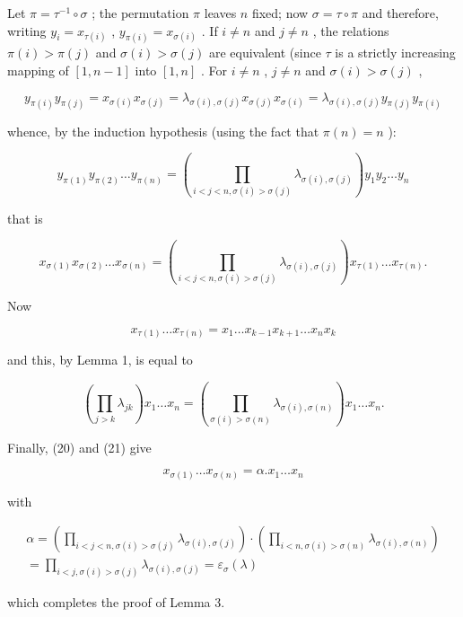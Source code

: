 Let \(\pi = \tau^{-1} \circ \sigma\) ; the permutation \(\pi\) leaves \(n\) fixed; now \(\sigma = \tau \circ \pi\) and therefore, writing \(y_i = x_{\tau(i)}\) , \(y_{\pi(i)} = x_{\sigma(i)}\) . If \(i \neq n\) and \(j \neq n\) , the relations \(\pi(i) > \pi(j)\) and \(\sigma(i) > \sigma(j)\) are equivalent (since \(\tau\) is a strictly increasing mapping of \([1, n - 1]\) into \([1, n]\) . For \(i \neq n\) , \(j \neq n\) and \(\sigma(i) > \sigma(j)\) ,

\[
y _ {\pi (i)} y _ {\pi (j)} = x _ {\sigma (i)} x _ {\sigma (j)} = \lambda_ {\sigma (i), \sigma (j)} x _ {\sigma (j)} x _ {\sigma (i)} = \lambda_ {\sigma (i), \sigma (j)} y _ {\pi (j)} y _ {\pi (i)}
\]

whence, by the induction hypothesis (using the fact that \(\pi(n) = n\) ):

\[
y _ {\pi (1)} y _ {\pi (2)} \dots y _ {\pi (n)} = \left(\prod_ {i <   j <   n, \sigma (i) > \sigma (j)} \lambda_ {\sigma (i), \sigma (j)}\right) y _ {1} y _ {2} \dots y _ {n}
\]

that is

\[
x _ {\sigma (1)} x _ {\sigma (2)} \dots x _ {\sigma (n)} = \left(\prod_ {i <   j <   n, \sigma (i) > \sigma (j)} \lambda_ {\sigma (i), \sigma (j)}\right) x _ {\tau (1)} \dots x _ {\tau (n)}.\tag{20}
\]

Now

\[
x _ {\tau (1)} \dots x _ {\tau (n)} = x _ {1} \dots x _ {k - 1} x _ {k + 1} \dots x _ {n} x _ {k}
\]

and this, by Lemma 1, is equal to

\[
\left(\prod_ {j > k} \lambda_ {j k}\right) x _ {1} \dots x _ {n} = \left(\prod_ {\sigma (i) > \sigma (n)} \lambda_ {\sigma (i), \sigma (n)}\right) x _ {1} \dots x _ {n}.\tag{21}
\]

Finally, (20) and (21) give

\[
x _ {\sigma (1)} \dots x _ {\sigma (n)} = \alpha . x _ {1} \dots x _ {n}
\]

with

\[
\begin{array}{l} \alpha = \left(\prod_ {i <   j <   n, \sigma (i) > \sigma (j)} \lambda_ {\sigma (i), \sigma (j)}\right) \cdot \left(\prod_ {i <   n, \sigma (i) > \sigma (n)} \lambda_ {\sigma (i), \sigma (n)}\right) \\ = \prod_ {i <   j, \sigma (i) > \sigma (j)} \lambda_ {\sigma (i), \sigma (j)} = \varepsilon_ {\sigma} (\lambda) \end{array}
\]

which completes the proof of Lemma 3.

